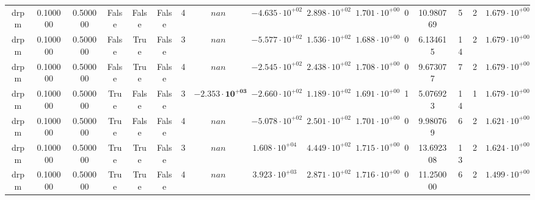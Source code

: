 \begin{table}
\begin{tabular}{cccccccccccccccc}
drpm & 0.100000 & 0.500000 & False & False & False & 4 & $nan$ & $-4.635 \cdot 10^{+02}$ & $2.898 \cdot 10^{+02}$ & $1.701 \cdot 10^{+00}$ & 0 & 10.980769 & 5 & 2 & $1.679 \cdot 10^{+00}$ \\
drpm & 0.100000 & 0.500000 & False & True & False & 3 & $nan$ & $-5.577 \cdot 10^{+02}$ & $1.536 \cdot 10^{+02}$ & $1.688 \cdot 10^{+00}$ & 0 & 6.134615 & 14 & 2 & $1.679 \cdot 10^{+00}$ \\
drpm & 0.100000 & 0.500000 & False & True & False & 4 & $nan$ & $-2.545 \cdot 10^{+02}$ & $2.438 \cdot 10^{+02}$ & $1.708 \cdot 10^{+00}$ & 0 & 9.673077 & 7 & 2 & $1.679 \cdot 10^{+00}$ \\
drpm & 0.100000 & 0.500000 & True & False & False & 3 & $\mathbf{-2.353 \cdot 10^{+03}}$ & $-2.660 \cdot 10^{+02}$ & $1.189 \cdot 10^{+02}$ & $1.691 \cdot 10^{+00}$ & 1 & 5.076923 & 14 & 1 & $1.679 \cdot 10^{+00}$ \\
drpm & 0.100000 & 0.500000 & True & False & False & 4 & $nan$ & $-5.078 \cdot 10^{+02}$ & $2.501 \cdot 10^{+02}$ & $1.701 \cdot 10^{+00}$ & 0 & 9.980769 & 6 & 2 & $1.621 \cdot 10^{+00}$ \\
drpm & 0.100000 & 0.500000 & True & True & False & 3 & $nan$ & $1.608 \cdot 10^{+04}$ & $4.449 \cdot 10^{+02}$ & $1.715 \cdot 10^{+00}$ & 0 & 13.692308 & 13 & 2 & $1.624 \cdot 10^{+00}$ \\
drpm & 0.100000 & 0.500000 & True & True & False & 4 & $nan$ & $3.923 \cdot 10^{+03}$ & $2.871 \cdot 10^{+02}$ & $1.716 \cdot 10^{+00}$ & 0 & 11.250000 & 6 & 2 & $1.499 \cdot 10^{+00}$ \\
\bottomrule
\end{tabular}
\end{table}
